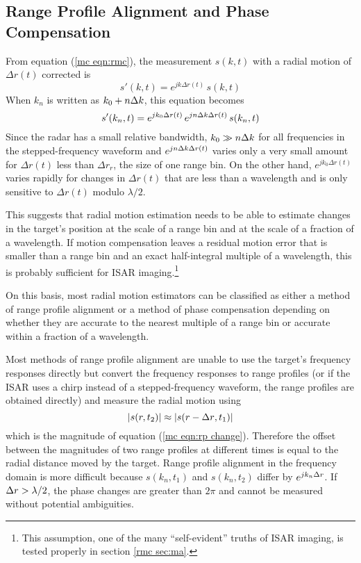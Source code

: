 \subsection{Range Profile Alignment and Phase Compensation}

From equation (\ref{mc eqn:rmc}), the measurement $s(k,t)$ with a radial
motion of $\Delta r(t)$ corrected is
\begin{equation}
s'(k,t)=e^{jk\Delta r(t)}\,s(k,t)
\end{equation}
When $k_n$ is written as $k_0+n{\Delta k}$, this equation becomes
\begin{equation}
s'(k_n,t)=e^{jk_0\Delta r(t)}\,e^{jn{\Delta k}\Delta r(t)}\,s(k_n,t)
\end{equation}
Since the radar has a small relative bandwidth, 
$k_0\gg n{\Delta k}$ for all frequencies in the stepped-frequency waveform 
and $e^{jn{\Delta k}\Delta r(t)}$ varies only a very small amount for $\Delta r(t)$
less than $\Delta r_r$, the size of one range bin.  On the other hand, 
$e^{jk_0\Delta r(t)}$ varies rapidly for changes in $\Delta r(t)$ that are 
less than a wavelength and is only sensitive to $\Delta r(t)$ modulo
$\lambda/2$.

This suggests that radial motion estimation needs to be able to estimate
changes in the target's position at the scale of a range bin and at the
scale of a fraction of a wavelength.  If motion compensation leaves a
residual motion error that is smaller than a range bin and an exact
half-integral multiple of a wavelength, this is probably sufficient for
ISAR imaging.\footnote{This assumption, one of the many ``self-evident''
truths of ISAR imaging, is tested properly in section \protect\ref{rmc
sec:ma}.}

On this basis, most radial motion estimators can be classified as either a
method of range profile alignment or a method of phase compensation
depending on whether they are accurate to the nearest multiple of a range
bin or accurate within a fraction of a wavelength.

Most methods of range profile alignment are unable to use the target's 
frequency responses directly but convert the frequency responses to range
profiles (or if the ISAR uses a chirp instead of a stepped-frequency
waveform, the range profiles are obtained directly) and measure the radial
motion using 
\begin{equation}
\left|s(r,t_2)\right|\approx 
\left|s(r-{\Delta r},t_1)\right|
\end{equation}
which is the magnitude of equation (\ref{mc eqn:rp change}).  Therefore the
offset between the magnitudes of two range profiles at different times is 
equal to the radial distance moved by the target.  Range profile alignment in
the frequency domain is more difficult because $s(k_n,t_1)$ and $s(k_n,t_2)$
differ by $e^{jk_n{\Delta r}}$.  If ${\Delta r}>\lambda/2$, the phase changes are greater
than $2\pi$ and cannot be measured without potential ambiguities.


